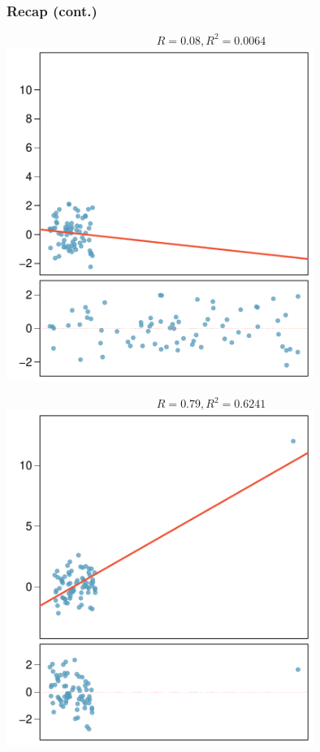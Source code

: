 \documentclass[notes,11pt, aspectratio=169]{beamer}
\begin{document}

\begin{frame}
\frametitle{Recap (cont.)}

\vspace{-1cm}

{
\begin{center}
\[ R = 0.08, R^2 = 0.0064 \]
\includegraphics[width=0.75\textwidth]{graphs/out5-1}
\end{center}
}
{
\begin{center}
\[ R = 0.79, R^2 = 0.6241 \]
\includegraphics[width=0.75\textwidth]{graphs/out5}
\end{center}
}

\end{frame}
\end{document}
